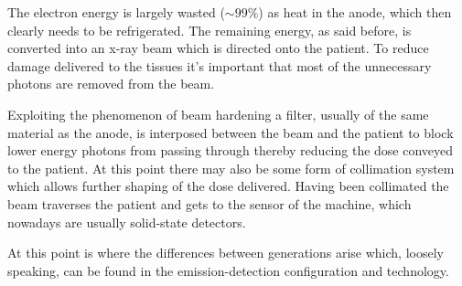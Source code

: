 The electron energy is largely wasted ($\sim 99\%$) as heat in the anode, which then clearly needs to be refrigerated. The remaining energy, as said before, is converted into an x-ray beam which is directed onto the patient. To reduce damage delivered to the tissues it's important that most of the unnecessary photons are removed from the beam.

Exploiting the phenomenon of beam hardening a filter, usually of the same material as the anode, is interposed between the beam and the patient to block lower energy photons from passing through thereby reducing the dose conveyed to the patient. At this point there may also be some form of collimation system which allows further shaping of the dose delivered. Having been collimated the beam traverses the patient and gets to the sensor of the machine, which nowadays are usually solid-state detectors.

At this point is where the differences between generations arise which, loosely speaking, can be found in the emission-detection configuration and technology.

